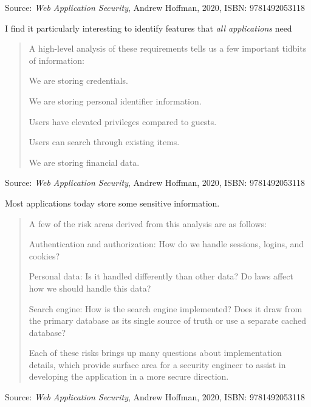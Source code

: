 \documentclass[Screen16to9,17pt]{foils}
\begin{document}
Source: \emph{Web Application Security}, Andrew Hoffman, 2020, ISBN: 9781492053118

\begin{list2}
\item I find it particularly interesting to identify features that \emph{all applications} need
\end{list2}


\begin{quote}
A high-level analysis of these requirements tells us a few important tidbits of
information:
\begin{list2}
\item We are storing credentials.
\item We are storing personal identifier information.
\item Users have elevated privileges compared to guests.
\item Users can search through existing items.
\item We are storing financial data.
\end{list2}
\end{quote}

Source: \emph{Web Application Security}, Andrew Hoffman, 2020, ISBN: 9781492053118


Most applications today store some sensitive information.



\begin{quote}
A few of the risk areas derived from this analysis are as follows:
\begin{list2}
\item Authentication and authorization: How do we handle sessions, logins, and
cookies?
\item Personal data: Is it handled differently than other data? Do laws affect how we
should handle this data?
\item Search engine: How is the search engine implemented? Does it draw from the
primary database as its single source of truth or use a separate cached database?
\end{list2}

Each of these risks brings up many questions about implementation details, which provide surface area for a security engineer to assist in developing the application in a more secure direction.
\end{quote}
Source: \emph{Web Application Security}, Andrew Hoffman, 2020, ISBN: 9781492053118
\end{document}
